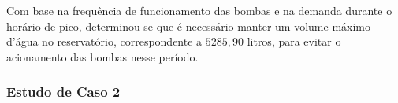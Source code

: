 Com base na frequência de funcionamento das bombas e na demanda durante o horário de pico, determinou-se que é necessário manter um volume máximo d'água no reservatório, correspondente a $5285,90$ litros, para evitar o acionamento das bombas nesse período.
%

%


\subsubsection{Estudo de Caso 2}



